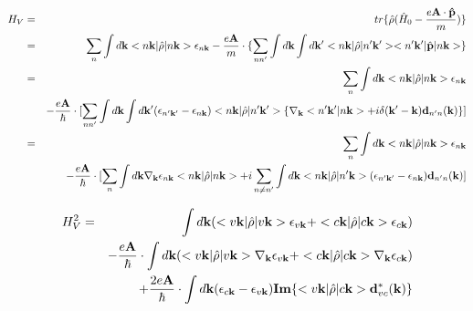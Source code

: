 \documentclass[aps,prb,preprint]{revtex4-1}
\begin{document}
\begin{appendix}
 \begin{eqnarray}
H_V &=& tr\{\hat{\rho}( \hat{H}_0 - \frac{e{\bf A \cdot \hat{p}}}{m}) \} \nonumber \\
&=& \sum_n \int d{\bf k} <n{\bf k}| \hat{\rho} |n{\bf k}> \epsilon_{n{\bf k}} - \frac{e{\bf A}}{m} \cdot \{ \sum_{nn'} \int d{\bf k} \int d{\bf k'} <n{\bf k}| \hat{\rho} |n'{\bf k'}><n'{\bf k'}| \hat{\bf p} |n{\bf k}> \} \nonumber \\
&=& \sum_n \int d{\bf k} <n{\bf k}| \hat{\rho} |n{\bf k}> \epsilon_{n{\bf k}}\nonumber  \\
&& - \frac{e{\bf A}}{\hbar} \cdot [ \sum_{nn'} \int d{\bf k} \int d{\bf k'}  (\epsilon_{n'{\bf k'}}-\epsilon_{n{\bf k}}) <n{\bf k}| \hat{\rho} |n'{\bf k'}>\{\nabla_{\bf k} <n'{\bf k'}|n{\bf k}> + i \delta({\bf k'-k}) {\bf d}_{n'n}({\bf k}) \} ] \nonumber \\
&=& \sum_n \int d{\bf k} <n{\bf k}| \hat{\rho} |n{\bf k}> \epsilon_{n{\bf k}} \nonumber \\
&& - \frac{e{\bf A}}{\hbar} \cdot [ \sum_{n} \int d{\bf k} \nabla_{\bf k} \epsilon_{n{\bf k}} <n{\bf k}| \hat{\rho} |n{\bf k}> + i \sum_{n \neq n'} \int d{\bf k} <n{\bf k}| \hat{\rho} |n'{\bf k}> (\epsilon_{n'{\bf k'}}-\epsilon_{n{\bf k}}) {\bf d}_{n'n}({\bf k})  ] 
\end{eqnarray}

 \begin{eqnarray}
H_V^2 &=& \int d{\bf k} (<v{\bf k}| \hat{\rho} |v{\bf k}> \epsilon_{v{\bf k}}+ <c{\bf k}| \hat{\rho} |c{\bf k}> \epsilon_{c{\bf k}}) \nonumber \\
&& - \frac{e{\bf A}}{\hbar} \cdot \int d{\bf k} ( <v{\bf k}| \hat{\rho} |v{\bf k}> \nabla_{\bf k} \epsilon_{v{\bf k}} + <c{\bf k}| \hat{\rho} |c{\bf k}> \nabla_{\bf k} \epsilon_{c{\bf k}} ) \nonumber \\
&& + \frac{2e{\bf A}}{\hbar} \cdot \int d{\bf k} (\epsilon_{c{\bf k}}-\epsilon_{v{\bf k}}) {\bf Im}\{<v{\bf k}| \hat{\rho} |c{\bf k}> {\bf d}_{vc}^*({\bf k}) \} \nonumber \\
\end{eqnarray}


\end{appendix}
\end{document}
